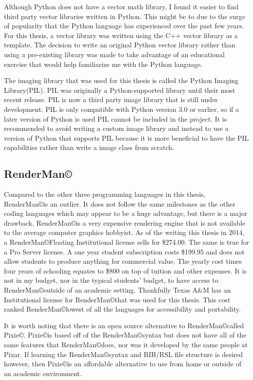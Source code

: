 Although Python does not have a vector math library, I found it easier to find third party vector libraries written in Python. This might be to due to the surge of popularity that the Python language has experienced over the past few years.  For this thesis, a vector library was written using the C++ vector library as a template.  The decision to write an original Python vector library rather than using a pre-existing library was made to take advantage of an educational exercise that would help familiarize me with the Python language.

The imaging library that was used for this thesis is called the Python Imaging Library(PIL).  PIL was originally a Python-supported library until their most recent release.  PIL is now a third party image library that is still under development.  PIL is only compatible with Python version 3.0 or earlier, so if a later version of Python is used PIL cannot be included in the project. It is recommended to avoid writing a custom image library and instead to use a version of Python that supports PIL because it is more beneficial to have the PIL capabilities rather than write a image class from scratch.
\subsection{RenderMan\copyright}
Compared to the other three programming languages in this thesis, RenderMan\copyright \space is an outlier.  It does not follow the same milestones as the other coding languages  which may appear to be a huge advantage, but there is a major drawback.  RenderMan\copyright\space is a very expensive rendering engine that is not available to the average computer graphics hobbyist.  As of the writing this thesis in 2014, a RenderMan\copyright\space Floating Institutional license sells for \$274.00.  The same is true for a Pro Server license.  A one year student subscription costs \$199.95 and does not allow students to produce anything for commercial value.  The yearly cost times four years of schooling equates to \$800 on top of tuition and other expenses.  It is not in my budget, nor in the typical students' budget, to have access to RenderMan\copyright\space outside of an academic setting.  Thankfully Texas A\&M has an Institutional license for RenderMan\copyright\space that was used for this thesis.  This cost ranked RenderMan\copyright\space lowest of all the languages for accessibility and portability.

It is worth noting that there is an open source alternative to RenderMan\copyright\space called Pixie\copyright.  Pixie\copyright\space is based off of the RenderMan\copyright\space syntax but does not have all of the same features that RenderMan\copyright\space does, nor was it developed by the same people at Pixar.  If learning the RenderMan\copyright\space syntax and RIB/RSL file structure is desired however, then Pixie\copyright\space is an affordable alternative to use from home or outside of an academic environment.

